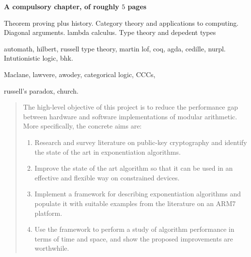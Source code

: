 {\bf A compulsory chapter,     of roughly $5$ pages}
\vspace{1cm}

\noindent
Theorem proving plus history. Category theory and applications to computing.
Diagonal arguments. lambda calculus.
Type theory and depedent types


automath, hilbert, russell type theory, martin lof, coq, agda, cedille, nurpl.
Intutionistic logic, bhk.

Maclane, lawvere, awodey, categorical logic, CCCs,

russell's paradox, church.


\begin{quote}
\noindent
The high-level objective of this project is to reduce the performance
gap between hardware and software implementations of modular arithmetic.
More specifically, the concrete aims are:

\begin{enumerate}
\item Research and survey literature on public-key cryptography and
      identify the state of the art in exponentiation algorithms.
\item Improve the state of the art algorithm so that it can be used
      in an effective and flexible way on constrained devices.
\item Implement a framework for describing exponentiation algorithms
      and populate it with suitable examples from the literature on
      an ARM7 platform.
\item Use the framework to perform a study of algorithm performance
      in terms of time and space, and show the proposed improvements
      are worthwhile.
\end{enumerate}
\end{quote}
